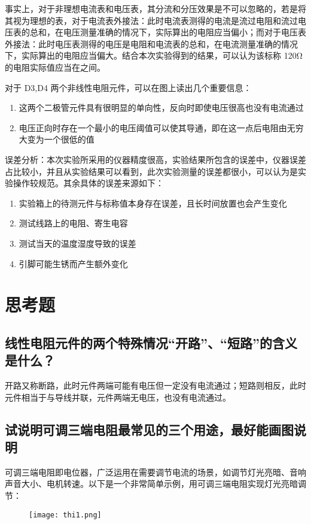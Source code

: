 \documentclass[a4paper,utf8]{article}
\begin{document}
        事实上，对于非理想电流表和电压表，其分流和分压效果是不可以忽略的，若是将其视为理想的表，对于电流表外接法：此时电流表测得的电流是流过电阻和流过电压表的总和，在电压测量准确的情况下，实际算出的电阻应当偏小；而对于电压表外接法：此时电压表测得的电压是电阻和电流表的总和，在电流测量准确的情况下，实际算出的电阻应当偏大。结合本次实验得到的结果，可以认为该标称 120\unit{\ohm}的电阻实际值应当在之间。\par
        对于 D3,D4 两个非线性电阻元件，可以在图上读出几个重要信息：
        \begin{enumerate}
            \item 这两个二极管元件具有很明显的单向性，反向时即使电压很高也没有电流通过
            \item 电压正向时存在一个最小的电压阈值可以使其导通，即在这一点后电阻由无穷大变为一个很低的值
        \end{enumerate}\par
        误差分析：本次实验所采用的仪器精度很高，实验结果所包含的误差中，仪器误差占比较小，并且从实验结果可以看到，此次实验测量的误差都很小，可以认为是实验操作较规范。其余具体的误差来源如下：
        \begin{enumerate}
            \item 实验箱上的待测元件与标称值本身存在误差，且长时间放置也会产生变化
            \item 测试线路上的电阻、寄生电容
            \item 测试当天的温度湿度导致的误差
            \item 引脚可能生锈而产生额外变化
        \end{enumerate}

\section{思考题}
    \subsection{线性电阻元件的两个特殊情况“开路”、“短路”的含义是什么？}
        开路又称断路，此时元件两端可能有电压但一定没有电流通过；短路则相反，此时元件相当于与导线并联，元件两端无电压，也没有电流通过。
    \subsection{试说明可调三端电阻最常见的三个用途，最好能画图说明}
        可调三端电阻即电位器，广泛运用在需要调节电流的场景，如调节灯光亮暗、音响声音大小、电机转速。以下是一个非常简单示例，用可调三端电阻实现灯光亮暗调节：
        \begin{figure}[!ht]
            \texttt{[image: thi1.png]}
        \end{figure}\par
\end{document}
